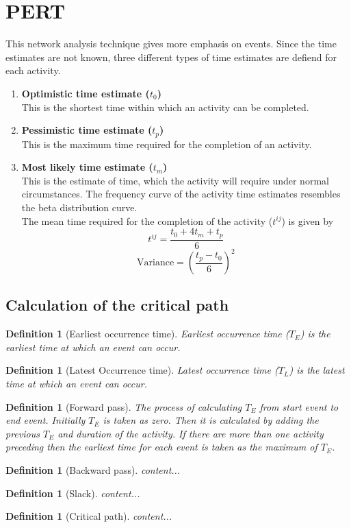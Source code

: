 \documentclass[oneside,11pt,pdftex]{book}%
\numberwithin{equation}{section}
\newtheorem{definition}[theorem]{Definition}
\numberwithin{section}{chapter}
\numberwithin{equation}{chapter}
\begin{document}
\section{PERT}
This network analysis technique gives more emphasis on events. Since the time estimates are not known, three different types of time estimates are defiend for each activity.

\begin{enumerate}
	\item \textbf{Optimistic time estimate ($ t_0 $)}\\
	This is the shortest time within which an activity can be completed.
	\item \textbf{Pessimistic time estimate ($ t_p $)}\\
	This is the maximum time required for the completion of an activity.
	\item\textbf{ Most likely time estimate ($ t_m $)}\\
	This is the estimate of time, which the activity will require under normal circumstances. The frequency curve of the activity time estimates resembles the beta distribution curve.\\
	The mean time required for the completion of the activity ($ t^{ij} $) is given by 
	\[ t^{ij}=\frac{t_0+4t_m+t_p}{6} \]
	\[ \text{Variance}=\left( \frac{t_p-t_0}{6} \right)^2 \]
\end{enumerate}

\subsection{Calculation of the critical path}

\begin{definition}[Earliest occurrence time]
	Earliest occurrence time ($ T_E $) is the earliest time at which an event can occur.
\end{definition}

\begin{definition}[Latest Occurrence time]
	Latest occurrence time ($ T_L $) is the latest time at which an event can occur.
\end{definition}

\begin{definition}[Forward pass]
	The process of calculating $ T_E$ from start event to end event. Initially $ T_E $ is taken as zero. Then it is calculated by adding the previous $ T_E $ and duration of the activity. If there are more than one activity preceding then the earliest time for each event is taken as the maximum of $ T_E $.
\end{definition}
\begin{definition}[Backward pass]
	content...
\end{definition}
\begin{definition}[Slack]
	content...
\end{definition}
\begin{definition}[Critical path]
	content...
\end{definition}
\end{document}
